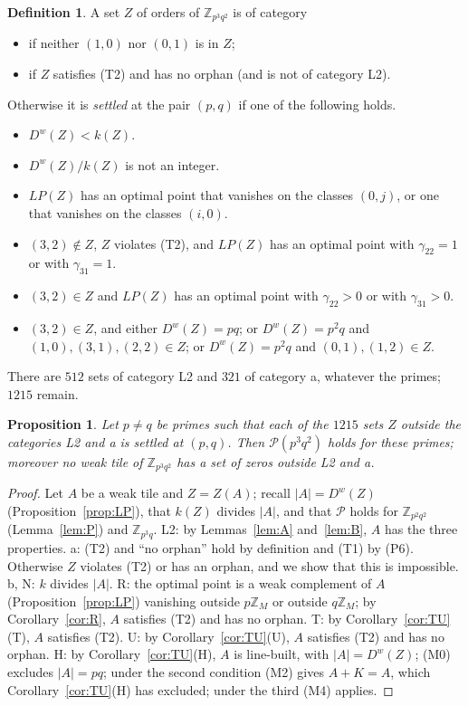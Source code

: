 \documentclass[11pt,a4paper]{amsart}
\newtheorem{proposition}[theorem]{Proposition}
\theoremstyle{definition}
\newtheorem{definition}[theorem]{Definition}
\theoremstyle{remark}
\newcommand{\Z}{\mathbb{Z}}
\newcommand{\PP}{\mathcal{P}}
\newcommand{\Dw}{D^{w}}
\begin{document}
\begin{definition}\label{def:cat}
A set $Z$ of orders of $\Z_{p^3q^2}$ is of category
\begin{itemize}
\item[\textbf{L2}] if neither $(1,0)$ nor $(0,1)$ is in $Z$;
\item[\textbf{a}] if $Z$ satisfies (T2) and has no orphan (and is not of category L2).
\end{itemize}
Otherwise it is \emph{settled} at the pair $(p,q)$ if one of the following holds.
\begin{itemize}
\item[\textbf{b}] $\Dw(Z)<k(Z)$.
\item[\textbf{N}] $\Dw(Z)/k(Z)$ is not an integer.
\item[\textbf{R}] $LP(Z)$ has an optimal point that vanishes on the classes $(0,j)$, or one that vanishes on
the classes $(i,0)$.
\item[\textbf{T}] $(3,2)\notin Z$, $Z$ violates (T2), and $LP(Z)$ has an optimal point with $\gamma_{22}=1$ or
with $\gamma_{31}=1$.
\item[\textbf{U}] $(3,2)\in Z$ and $LP(Z)$ has an optimal point with $\gamma_{22}>0$ or with $\gamma_{31}>0$.
\item[\textbf{H}] $(3,2)\in Z$, and either $\Dw(Z)=pq$; or $\Dw(Z)=p^2q$ and $(1,0),(3,1),(2,2)\in Z$; or
$\Dw(Z)=p^2q$ and $(0,1),(1,2)\in Z$.
\end{itemize}
\end{definition}

There are $512$ sets of category L2 and $321$ of category a, whatever the primes; $1215$ remain.

\begin{proposition}\label{prop:sort}
Let $p\ne q$ be primes such that each of the $1215$ sets $Z$ outside the categories \textup{L2} and \textup{a}
is settled at $(p,q)$. Then $\PP(p^3q^2)$ holds for these primes; moreover no weak tile of $\Z_{p^3q^2}$ has a
set of zeros outside \textup{L2} and \textup{a}.
\end{proposition}

\begin{proof}
Let $A$ be a weak tile and $Z=Z(A)$; recall $|A|=\Dw(Z)$ (Proposition~\ref{prop:LP}), that $k(Z)$ divides $|A|$,
and that $\PP$ holds for $\Z_{p^2q^2}$ (Lemma~\ref{lem:P}) and $\Z_{p^3q}$.
L2: by Lemmas~\ref{lem:A} and~\ref{lem:B}, $A$ has the three properties. a: (T2) and ``no orphan'' hold by
definition and (T1) by (P6). Otherwise $Z$ violates (T2) or has an orphan, and we show that this is impossible.
b, N: $k$ divides $|A|$. R: the optimal point is a weak complement of $A$ (Proposition~\ref{prop:LP}) vanishing
outside $p\Z_M$ or outside $q\Z_M$; by Corollary~\ref{cor:R}, $A$ satisfies (T2) and has no orphan. T: by
Corollary~\ref{cor:TU}(T), $A$ satisfies (T2). U: by Corollary~\ref{cor:TU}(U), $A$ satisfies (T2) and has no
orphan. H: by Corollary~\ref{cor:TU}(H), $A$ is line-built, with $|A|=\Dw(Z)$; (M0) excludes $|A|=pq$; under
the second condition (M2) gives $A+K=A$, which Corollary~\ref{cor:TU}(H) has excluded; under the third (M4)
applies.
\end{proof}
\end{document}
